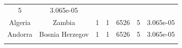 \documentclass[10pt,]{article}
\begin{document}
\begin{longtable}[]{@{}ccccccc@{}}
\begin{minipage}[t]{0.10\columnwidth}
5\strut
\end{minipage} & \begin{minipage}[t]{0.10\columnwidth}\centering\strut
3.065e-05\strut
\end{minipage}\tabularnewline
\begin{minipage}[t]{0.11\columnwidth}\centering\strut
Algeria\strut
\end{minipage} & \begin{minipage}[t]{0.16\columnwidth}\centering\strut
Zambia\strut
\end{minipage} & \begin{minipage}[t]{0.11\columnwidth}\centering\strut
1\strut
\end{minipage} & \begin{minipage}[t]{0.08\columnwidth}\centering\strut
1\strut
\end{minipage} & \begin{minipage}[t]{0.13\columnwidth}\centering\strut
6526\strut
\end{minipage} & \begin{minipage}[t]{0.10\columnwidth}\centering\strut
5\strut
\end{minipage} & \begin{minipage}[t]{0.10\columnwidth}\centering\strut
3.065e-05\strut
\end{minipage}\tabularnewline
\begin{minipage}[t]{0.11\columnwidth}\centering\strut
Andorra\strut
\end{minipage} & \begin{minipage}[t]{0.16\columnwidth}\centering\strut
Bosnia Herzegov\strut
\end{minipage} & \begin{minipage}[t]{0.11\columnwidth}\centering\strut
1\strut
\end{minipage} & \begin{minipage}[t]{0.08\columnwidth}\centering\strut
1\strut
\end{minipage} & \begin{minipage}[t]{0.13\columnwidth}\centering\strut
6526\strut
\end{minipage} & \begin{minipage}[t]{0.10\columnwidth}\centering\strut
5\strut
\end{minipage} & \begin{minipage}[t]{0.10\columnwidth}\centering\strut
3.065e-05\strut
\end{minipage}\tabularnewline
\begin{minipage}[t]{0.11\columnwidth}\centering\strut

\end{minipage}
\end{longtable}
\end{document}
